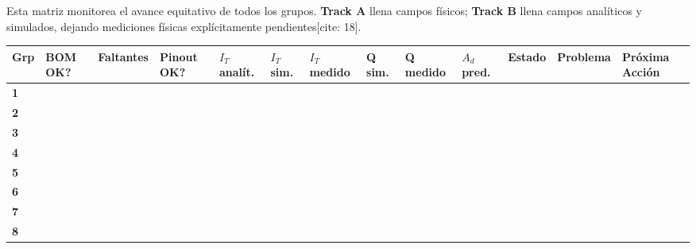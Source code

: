 \documentclass[10pt, a4paper, landscape]{article}
\begin{document}
\begin{tcolorbox}[colback=ucbblue!5, colframe=ucbblue, title=\textbf{Matriz de Progreso Dual-Track (Hardware y Simulación) — Hito 2}]
    Esta matriz monitorea el avance equitativo de todos los grupos. \textbf{Track A} llena campos físicos; \textbf{Track B} llena campos analíticos y simulados, dejando mediciones físicas explícitamente pendientes[cite: 18].
\end{tcolorbox}

\vspace{0.3cm}

{\footnotesize %
\renewcommand{\arraystretch}{2}
\begin{tabularx}{\textwidth}{|C{0.6cm}|C{1.1cm}|L|C{1.3cm}|C{1.5cm}|C{1.3cm}|C{1.5cm}|C{1.5cm}|C{1.5cm}|C{1.5cm}|C{1.3cm}|L|L|}
\hline
{}
\textbf{Grp} & \textbf{BOM OK?} & \textbf{Faltantes} & \textbf{Pinout OK?} & \textbf{$I_T$ analít.} & \textbf{$I_T$ sim.} & \textbf{$I_T$ medido} & \textbf{Q sim.} & \textbf{Q medido} & \textbf{$A_d$ pred.} & \textbf{Estado} & \textbf{Problema} & \textbf{Próxima Acción} \\ \hline
\textbf{1} & & & & & & & & & & & & \\ \hline
\textbf{2} & & & & & & & & & & & & \\ \hline
\textbf{3} & & & & & & & & & & & & \\ \hline
\textbf{4} & & & & & & & & & & & & \\ \hline
\textbf{5} & & & & & & & & & & & & \\ \hline
\textbf{6} & & & & & & & & & & & & \\ \hline
\textbf{7} & & & & & & & & & & & & \\ \hline
\textbf{8} & & & & & & & & & & & & \\ \hline
\end{tabularx}
}
\end{document}
